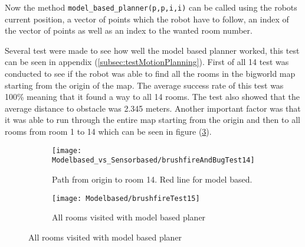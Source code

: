 \documentclass[../Head/Main.tex]{subfiles}
\begin{document}
Now the method \texttt{model\_based\_planner(p,p,i,i)} can be called using the robots current position, a vector of points which the robot have to follow, an index of the vector of points as well as an index to the wanted room number. 

Several test were made to see how well the model based planner worked, this test can be seen in appendix (\ref{subsec:testMotionPlanning}). First of all 14 test was conducted to see if the robot was able to find all the rooms in the bigworld map starting from the origin of the map. The average success rate of this test was 100\% meaning that it found a way to all 14 rooms. The test also showed that the average distance to obstacle was 2.345 meters. Another important factor was that it was able to run through the entire map starting from the origin and then to all rooms from room 1 to 14 which can be seen in figure (\ref{fig:brushfireCompletePath}). 

  \begin{figure}[H]
   \begin{subfigure}[b]{0.49\textwidth}
    \centering
    \texttt{[image: Modelbased\_vs\_Sensorbased/brushfireAndBugTest14]}
    \caption{Path from origin to room 14. Red line for model based.}
    \label{fig:brushfireToRoom14}
  \end{subfigure}
  \hfill
   \begin{subfigure}[b]{0.49\textwidth}
    \centering
    \texttt{[image: Modelbased/brushfireTest15]}
    \caption{All rooms visited with model based planer}
    \label{fig:brushfireCompletePath}
  \end{subfigure}
  \end{figure}  
\end{document}
